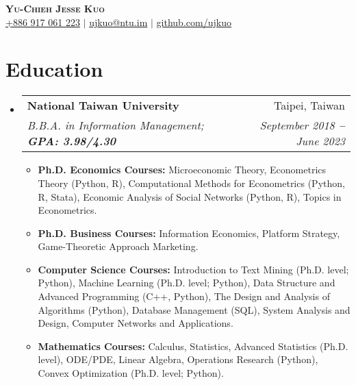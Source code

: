 \documentclass[letterpaper,11pt]{article}
\makeatletter
\newcommand{\resumeItem}[1]{
  \item\small{
    {#1 \vspace{-2pt}}
  }
}
\newcommand{\resumeSubheading}[4]{
  \vspace{-7pt}\item
    \begin{tabular*}{\textwidth}[t]{l@{\extracolsep{\fill}}r}
      \textbf{#1} & #2 \\
      \textit{\small#3} & \textit{\small #4} \\
    \end{tabular*}\vspace{-7pt}
}
\newcommand{\resumeSubHeadingListStart}{\begin{itemize}[leftmargin=0in, label={}]}
\newcommand{\resumeSubHeadingListEnd}{\end{itemize}}
\newcommand{\resumeItemListStart}{\begin{itemize}[leftmargin=0.13in]}
\newcommand{\resumeItemListEnd}{\end{itemize}\vspace{-5pt}}
\makeatother
\begin{document}

\begin{center}
    \textbf{\Huge \scshape Yu-Chieh Jesse Kuo} \\ \vspace{3pt}
    \small
    \faMobile \hspace{.5pt} \href{tel:886917061223}{+886 917 061 223}
    $|$
    \hspace{.5pt} \href{mailto:ujkuo@ntu.im}{ujkuo@ntu.im}
    $|$
    \faGithub \hspace{.5pt} \href{https://github.com/ujkuo}{github.com/ujkuo}
\end{center}


\section{Education}
  \vspace{1pt}
  \resumeSubHeadingListStart
    
    \resumeSubheading
      {National Taiwan University
      }{Taipei, Taiwan}
      {B.B.A. in Information Management;   \textbf{GPA: 3.98/4.30}}{September 2018 \textbf{--} June 2023}
      \resumeItemListStart
        \resumeItem{\textbf{Ph.D. Economics Courses:}
                Microeconomic Theory, Econometrics Theory (Python, R),
                Computational Methods for Econometrics (Python, R, Stata),
                Economic Analysis of Social Networks (Python, R),
                Topics in Econometrics.}
        \resumeItem{\textbf{Ph.D. Business Courses:}
                Information Economics, Platform Strategy,
                Game-Theoretic Approach Marketing.}
        \resumeItem{\textbf{Computer Science Courses:}
            Introduction to Text Mining (Ph.D. level; Python),
            Machine Learning (Ph.D. level; Python),
                Data Structure and Advanced Programming (C++, Python),
                The Design and Analysis of Algorithms (Python),
                Database Management (SQL),
                System Analysis and Design,
                Computer Networks and Applications.}
        \resumeItem{\textbf{Mathematics Courses:}
                Calculus,
                Statistics,
                Advanced Statistics (Ph.D. level),
                ODE/PDE,
                Linear Algebra,
                Operations Research (Python),
                Convex Optimization (Ph.D. level; Python).}
      \resumeItemListEnd
  \resumeSubHeadingListEnd
\end{document}
